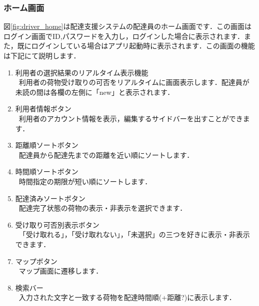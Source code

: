 \documentclass[a4j,titlepage]{jarticle}
\begin{document}
\subsubsection{ホーム画面}
図\ref{fig:driver_home}は配達支援システムの配達員のホーム画面です．この画面はログイン画面でID,パスワードを入力し，ログインした場合に表示されます．また，既にログインしている場合はアプリ起動時に表示されます．この画面の機能は下記にて説明します．
\begin{enumerate}
	\item 利用者の選択結果のリアルタイム表示機能\\
	 \ 利用者の荷物受け取りの可否をリアルタイムに画面表示します．配達員が未読の間は各欄の左側に「new」と表示されます．
	\item 利用者情報ボタン\\
	 \ 利用者のアカウント情報を表示，編集するサイドバーを出すことができます．
	\item 距離順ソートボタン\\
	 \ 配達員から配達先までの距離を近い順にソートします．
	\item 時間順ソートボタン\\
   \ 時間指定の期限が短い順にソートします．
	\item 配達済みソートボタン\\
   \ 配達完了状態の荷物の表示・非表示を選択できます．
	\item 受け取り可否別表示ボタン\\
	 \ 「受け取れる」，「受け取れない」，「未選択」の三つを好きに表示・非表示できます．
	\item マップボタン\\
   \ マップ画面に遷移します．
	\item 検索バー\\
	 \ 入力された文字と一致する荷物を配達時間順(+距離?)に表示します．
\end{enumerate}
\end{document}
